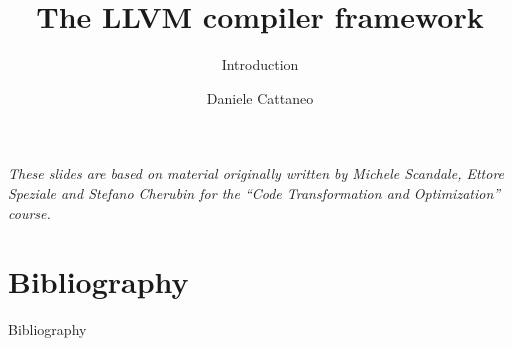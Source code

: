

\author{Daniele Cattaneo}
\date{\DATE}
\title{The LLVM compiler framework}
\subtitle{Introduction}
\newcommand{\customdata}{Daniele Cattaneo <daniele.cattaneo@polimi.it>}






\begin{frame}
\maketitle
\begin{center}
\itshape\scriptsize
These slides are based on material originally written by
Michele Scandale, Ettore Speziale and Stefano Cherubin for the
``Code Transformation and Optimization'' course.
\end{center}
\end{frame}









\section{Bibliography}
\begin{frame}[allowframebreaks]{Bibliography}
\nocite{*}


\end{frame}



